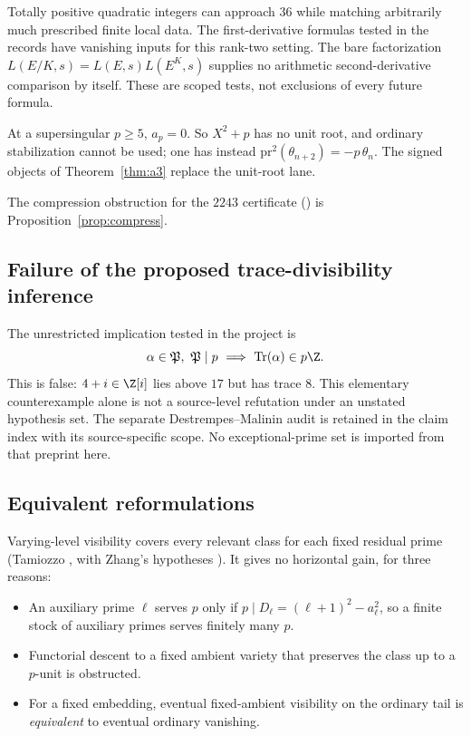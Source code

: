\begin{obstruction}\label{obs:local}
Totally positive quadratic integers can approach $36$ while matching arbitrarily much prescribed finite local data. The first-derivative formulas tested in the records have vanishing inputs for this rank-two setting. The bare factorization $L(E/K,s)=L(E,s)L(E^K,s)$ supplies no arithmetic second-derivative comparison by itself. These are scoped tests, not exclusions of every future formula.
\end{obstruction}

\begin{obstruction}\label{obs:ssunit}
At a supersingular $p\ge5$, $a_p=0$. So $X^2+p$ has no unit root, and ordinary stabilization cannot be used; one has instead $\mathrm{pr}^2(\theta_{n+2})=-p\,\theta_n$. The signed objects of Theorem~\ref{thm:a3} replace the unit-root lane.
\end{obstruction}

The compression obstruction for the $2243$ certificate () is Proposition~\ref{prop:compress}.

\subsection{Failure of the proposed trace-divisibility inference}
\begin{obstruction}\label{obs:dm}
The unrestricted implication tested in the project is
\[
\alpha\in\mathfrak P,\ \mathfrak P\mid p\ \Longrightarrow\ \mathrm{Tr}(\alpha)\in p\Z .
\]
This is false: $4+i\in\Z[i]$ lies above $17$ but has trace $8$. This elementary counterexample alone is not a source-level refutation under an unstated hypothesis set. The separate Destrempes--Malinin audit is retained in the claim index with its source-specific scope. No exceptional-prime set is imported from that preprint here.
\end{obstruction}

\subsection{Equivalent reformulations}
\begin{researchrecord}\label{obs:vis}
Varying-level visibility covers every relevant class for each fixed residual prime (Tamiozzo \cite{tamiozzo}, with Zhang's hypotheses \cite{zhang}). It gives no horizontal gain, for three reasons:
\begin{itemize}[leftmargin=*]
\item An auxiliary prime $\ell$ serves $p$ only if $p\mid D_\ell=(\ell+1)^2-a_\ell^2$, so a finite stock of auxiliary primes serves finitely many $p$.
\item Functorial descent to a fixed ambient variety that preserves the class up to a $p$-unit is obstructed.
\item For a fixed embedding, eventual fixed-ambient visibility on the ordinary tail is \emph{equivalent} to eventual ordinary vanishing.
\end{itemize}
\end{researchrecord}

